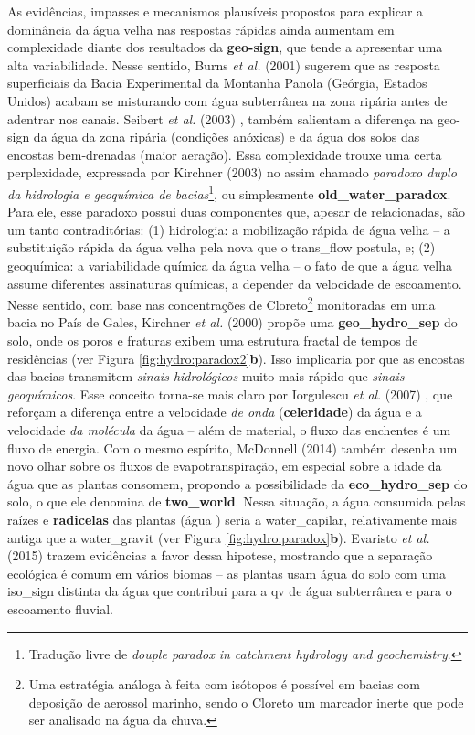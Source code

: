 \documentclass[./main.tex]{subfiles}
\begin{document}
\par As evidências, impasses e mecanismos plausíveis propostos para explicar a dominância da água velha nas respostas rápidas ainda aumentam em complexidade diante dos resultados da \textbf{\gls{geo-sign}}, que tende a apresentar uma alta variabilidade. Nesse sentido, Burns \textit{et al.} (2001) \cite{burns2001quantifying} sugerem que as resposta superficiais da Bacia Experimental da Montanha Panola (Geórgia, Estados Unidos) acabam se misturando com água subterrânea na zona ripária antes de adentrar nos canais. Seibert \textit{et al.} (2003) \cite{seibert2003groundwater}, também salientam a diferença na \gls{geo-sign} da água da zona ripária (condições anóxicas) e da água dos solos das encostas bem-drenadas (maior aeração). Essa complexidade trouxe uma certa perplexidade, expressada por Kirchner (2003) \cite{Kirchner2003} no assim chamado \textit{paradoxo duplo da hidrologia e geoquímica de bacias}\footnote{Tradução livre de \textit{douple paradox in catchment hydrology and geochemistry}.}, ou simplesmente \textbf{\gls{old_water_paradox}}. Para ele, esse paradoxo possui duas componentes que, apesar de relacionadas, são um tanto contraditórias: (1) hidrologia: a mobilização rápida de água velha -- a substituição rápida da água velha pela nova que o \gls{trans_flow} postula, e; (2) geoquímica: a variabilidade química da água velha -- o fato de que a água velha assume diferentes assinaturas químicas, a depender da velocidade de escoamento. Nesse sentido, com base nas concentrações de Cloreto\footnote{Uma estratégia análoga à feita com isótopos é possível em bacias com deposição de aerossol marinho, sendo o Cloreto um marcador inerte que pode ser analisado na água da chuva.} monitoradas em uma bacia no País de Gales, Kirchner \textit{et al.} (2000) \cite{kirchner2000} propõe uma \textbf{\gls{geo_hydro_sep}} do solo, onde os poros e fraturas exibem uma estrutura fractal de tempos de residências (ver Figura \ref{fig:hydro:paradox2}\textbf{b}). Isso implicaria por que as encostas das bacias transmitem \textit{sinais hidrológicos} muito mais rápido que \textit{sinais geoquímicos}. Esse conceito torna-se mais claro por Iorgulescu \textit{et al}. (2007) \cite{Iorgulescu2007}, que reforçam a diferença entre a velocidade \textit{de onda} (\textbf{celeridade}) da água e a velocidade \textit{da molécula} da água -- além de material, o fluxo das enchentes é um fluxo de energia. Com o mesmo espírito, McDonnell (2014) \cite{mcdonnell2014} também desenha um novo olhar sobre os fluxos de evapotranspiração, em especial sobre a idade da água que as plantas consomem, propondo a possibilidade da \textbf{\gls{eco_hydro_sep}} do solo, o que ele denomina de \textbf{\gls{two_world}}. Nessa situação, a água consumida pelas raízes e \textbf{radicelas} das plantas (água ) seria a \gls{water_capilar}, relativamente mais antiga que a \gls{water_gravit} (ver Figura \ref{fig:hydro:paradox}\textbf{b}). Evaristo \textit{et al.} (2015) \cite{Evaristo2015} trazem evidências a favor dessa \gls{hipotese}, mostrando que a separação ecológica é comum em vários biomas -- as plantas usam água do solo com uma \gls{iso_sign} distinta da água que contribui para a \gls{qv} de água subterrânea e para o escoamento fluvial.
\end{document}
